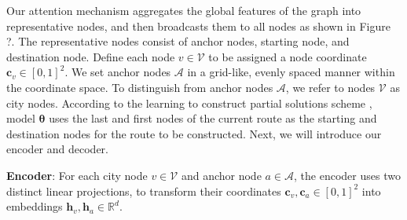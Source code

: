 Our attention mechanism aggregates the global features of the graph into representative nodes, and then broadcasts them to all nodes as shown in Figure ?. 
The representative nodes consist of anchor nodes, starting node, and destination node.
Define each node $v \in \mathcal{V}$ to be assigned a node coordinate $\mathbf{c}_v \in [0,1]^2$. 
We set 
anchor nodes $\mathcal{A}$ in a grid-like, evenly spaced manner within the coordinate space. 
To distinguish from anchor nodes $\mathcal{A}$, we refer to nodes $\mathcal{V}$ as city nodes. 
According to the learning to construct partial solutions scheme \cite{luo2023neural}, model $\boldsymbol{\theta}$ uses the last and first nodes of the current route as the starting and destination nodes for the route to be constructed. 
Next, we will introduce our encoder and decoder. 

\textbf{Encoder}: For each city node $v \in \mathcal{V}$ and anchor node $a \in \mathcal{A}$, the encoder uses two distinct linear projections, to transform their coordinates ${\mathbf{c}}_{v},{\mathbf{c}}_{a} \in [0,1]^{2}$ into embeddings $\mathbf{h}_{v},\mathbf{h}_{a} \in \mathbb{R}^d$. 

